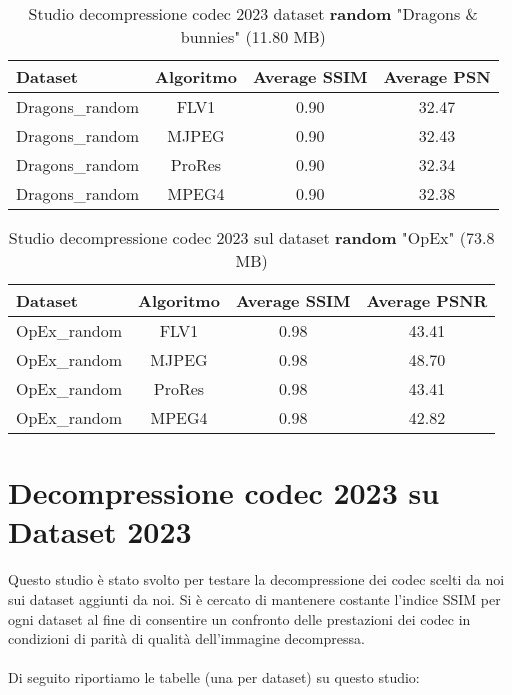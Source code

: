 \begin{table}[ht]
\centering
\begin{tabular}{|l|c|c|c|}
\hline
Dataset               & Algoritmo & Average SSIM & Average PSN  \\ \hline
Dragons\_random       & FLV1      & 0.90        & 32.47       \\ \hline
Dragons\_random       & MJPEG     & 0.90        & 32.43       \\ \hline
Dragons\_random       & ProRes    & 0.90        & 32.34       \\ \hline
Dragons\_random       & MPEG4     & 0.90        & 32.38       \\ \hline
\end{tabular}
\caption{Studio decompressione codec 2023 dataset \textbf{random} "Dragons \& bunnies" (11.80 MB)}
\end{table}

\begin{table}[ht]
\centering
\begin{tabular}{|l|c|c|c|}
\hline
Dataset               & Algoritmo & Average SSIM & Average PSNR \\ \hline
OpEx\_random          & FLV1      & 0.98        & 43.41       \\ \hline
OpEx\_random          & MJPEG     & 0.98        & 48.70       \\ \hline
OpEx\_random          & ProRes    & 0.98        & 43.41       \\ \hline
OpEx\_random          & MPEG4     & 0.98        & 42.82       \\ \hline
\end{tabular}
\caption{Studio decompressione codec 2023 sul dataset \textbf{random} "OpEx"  (73.8 MB)}
\end{table}

\clearpage

\clearpage
\section{Decompressione codec 2023 su Dataset 2023}
Questo studio è stato svolto per testare la decompressione dei codec scelti da noi sui dataset aggiunti da noi. Si è cercato di mantenere costante l'indice SSIM per ogni dataset al fine di consentire un confronto delle prestazioni dei codec in condizioni di parità di qualità dell'immagine decompressa.
\\
\\
Di seguito riportiamo le tabelle (una per dataset) su questo studio:
    
